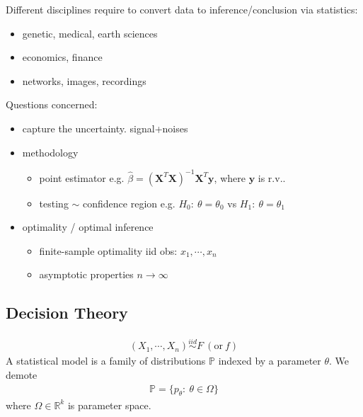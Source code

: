 
Different disciplines require to convert data to 
inference/conclusion via statistics:
\begin{itemize}
    \item genetic, medical, earth sciences
    \item economics, finance
    \item networks, images, recordings
\end{itemize}
$~$\\
Questions concerned:
\begin{itemize}
    \item capture the uncertainty. {\color{gray}signal+noises}
    \item methodology
    \begin{itemize}
        \item point estimator 
        {\color{gray}e.g. 
        $\hat{\beta}=
        (\boldsymbol{X}^T\boldsymbol{X})^{-1}\boldsymbol{X}^T\boldsymbol{y}$, where $\boldsymbol{y}$ is r.v..
        }
        \item testing $\sim$ confidence region
        {\color{gray} e.g.
        $H_0:~\theta=\theta_0$ vs $H_1:~\theta=\theta_1$
        }
    \end{itemize}
    \item optimality / optimal inference
    \begin{itemize}
        \item finite-sample optimality 
        {\color{gray}
        iid obs: $x_1,\cdots,x_n$
        }
        \item asymptotic properties 
        {\color{gray} 
        $n\to\infty$
        }
    \end{itemize}
\end{itemize}

\subsection{Decision Theory \citep{Wald1939}}

\begin{gather}
    (X_1,\cdots,X_n)\overset{iid}{\sim}F~(\text{or}~f)
\end{gather}
A statistical model is a family of distributions $\mathbb{P}$ indexed by
a parameter $\theta$. We demote
\begin{gather}
    \mathbb{P}=\{p_\theta:~\theta\in\Omega\}
\end{gather}
where $\Omega\in\mathbb{R}^k$ is parameter space.

